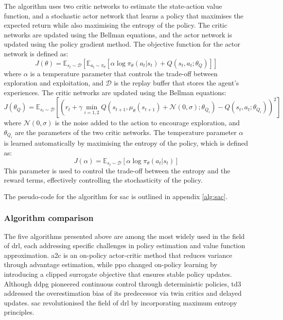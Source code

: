 The algorithm uses two critic networks to estimate the state-action value function, and a stochastic actor network that learns a policy that maximises the expected return while also maximising the entropy of the policy. The critic networks are updated using the Bellman equations, and the actor network is updated using the policy gradient method. The objective function for the actor network is defined as:
\begin{equation}
    J(\theta) = \mathbb{E}_{s_t \sim \mathcal{D}} \left[\mathbb{E}_{a_t \sim \pi_\theta} \left[\alpha \log \pi_\theta(a_t | s_t) + Q(s_t, a_t; \theta_Q)\right]\right]
\end{equation}
where $\alpha$ is a temperature parameter that controls the trade-off between exploration and exploitation, and $\mathcal{D}$ is the replay buffer that stores the agent's experiences. The critic networks are updated using the Bellman equations:
\begin{equation}
    J(\theta_Q) = \mathbb{E}_{s_t \sim \mathcal{D}} \left[\left(r_t + \gamma \min_{i=1,2} Q(s_{t+1}, \mu_\theta(s_{t+1}) + \mathcal{N}(0, \sigma); \theta_{Q_i}) - Q(s_t, a_t; \theta_{Q_i})\right)^2\right]
\end{equation}
where $\mathcal{N}(0, \sigma)$ is the noise added to the action to encourage exploration, and $\theta_{Q_i}$ are the parameters of the two critic networks. The temperature parameter $\alpha$ is learned automatically by maximising the entropy of the policy, which is defined as:
\begin{equation}
    J(\alpha) = \mathbb{E}_{s_t \sim \mathcal{D}} \left[\alpha \log \pi_\theta(a_t | s_t)\right]
\end{equation}
This parameter is used to control the trade-off between the entropy and the reward terms, effectively controlling the stochasticity of the policy.

The pseudo-code for the algorithm for \acrshort{sac} is outlined in appendix \ref{alg:sac}.

\subsubsection{Algorithm comparison}

The five algorithms presented above are among the most widely used in the field of \acrshort{drl}, each addressing specific challenges in policy estimation and value function approximation. \acrshort{a2c} is an on-policy actor-critic method that reduces variance through advantage estimation, while \acrshort{ppo} changed on-policy learning by introducing a clipped surrogate objective that ensures stable policy updates. Although \acrshort{ddpg} pioneered continuous control through deterministic policies, \acrshort{td3} addressed the overestimation bias of its predecessor via twin critics and delayed updates. \acrshort{sac} revolutionised the field of \acrshort{drl} by incorporating maximum entropy principles.


